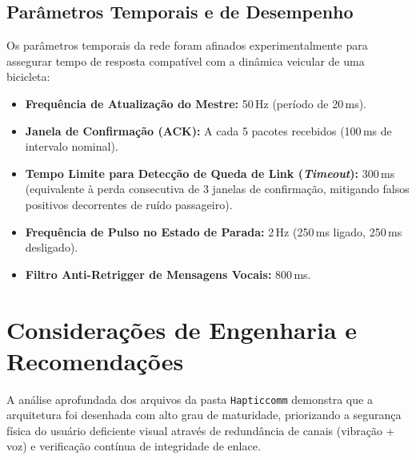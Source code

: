 \documentclass[12pt,a4paper]{article}
\begin{document}
\subsection{Parâmetros Temporais e de Desempenho}
Os parâmetros temporais da rede foram afinados experimentalmente para assegurar tempo de resposta compatível com a dinâmica veicular de uma bicicleta:
\begin{itemize}
    \item \textbf{Frequência de Atualização do Mestre:} 50\,Hz (período de 20\,ms).
    \item \textbf{Janela de Confirmação (ACK):} A cada 5 pacotes recebidos (100\,ms de intervalo nominal).
    \item \textbf{Tempo Limite para Detecção de Queda de Link (\textit{Timeout}):} 300\,ms (equivalente à perda consecutiva de 3 janelas de confirmação, mitigando falsos positivos decorrentes de ruído passageiro).
    \item \textbf{Frequência de Pulso no Estado de Parada:} 2\,Hz (250\,ms ligado, 250\,ms desligado).
    \item \textbf{Filtro Anti-Retrigger de Mensagens Vocais:} 800\,ms.
\end{itemize}

\newpage
\section{Considerações de Engenharia e Recomendações}

A análise aprofundada dos arquivos da pasta \texttt{Hapticcomm} demonstra que a arquitetura foi desenhada com alto grau de maturidade, priorizando a segurança física do usuário deficiente visual através de redundância de canais (vibração + voz) e verificação contínua de integridade de enlace.
\end{document}
